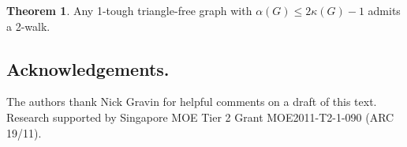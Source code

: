\documentclass{amsart}
\theoremstyle{definition}
\newtheorem{theorem}{Theorem}
\begin{document}
\begin{theorem}
Any 1-tough triangle-free graph with  $\alpha(G)\le2\kappa(G)-1$ admits a 2-walk.
\end{theorem}



\subsection*{Acknowledgements.}
The authors thank Nick Gravin
for helpful comments on a draft of this text.
Research supported by Singapore MOE Tier 2 Grant MOE2011-T2-1-090 (ARC 19/11). 



%
\end{document}

